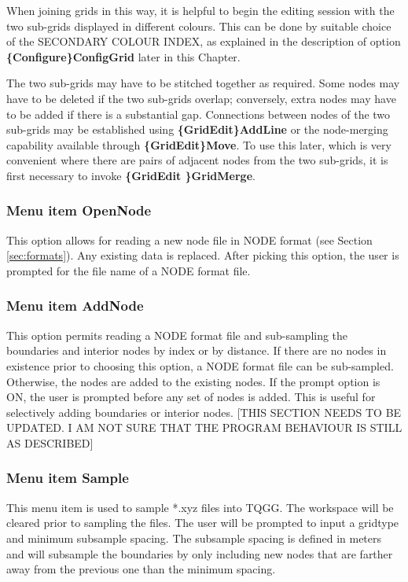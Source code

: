\documentclass{article}
\begin{document}
When joining grids in this way, it is helpful to begin the editing session with the two sub-grids displayed in different colours. This can be done by suitable choice of the SECONDARY COLOUR INDEX, as explained in the description of option \textbf{\{Configure\}ConfigGrid} later in this Chapter.

The two sub-grids may have to be stitched together as required. Some nodes may have to be deleted if the two sub-grids overlap; conversely, extra nodes may have to be added if there is a substantial gap. Connections between nodes of the two sub-grids may be established using \textbf{\{GridEdit\}AddLine} or the node-merging capability available through \textbf{\{GridEdit\}Move}. To use this later, which is very convenient where there are pairs of adjacent nodes from the two sub-grids, it is first necessary to invoke \textbf{\{GridEdit \}GridMerge}.

\subsubsection[Menu item OpenNode]{Menu item OpenNode}
This option allows for reading a new node file in NODE format (see Section \ref{sec:formats}). Any existing data is replaced. After picking this option, the user is prompted for the file name of a NODE format file.

\subsubsection[Menu item AddNode]{Menu item AddNode}
This option permits reading a NODE format file and sub-sampling the boundaries and interior nodes by index or by distance. If there are no nodes in existence prior to choosing this option, a NODE format file can be sub-sampled. Otherwise, the nodes are added to the existing nodes. If the prompt option is ON, the user is prompted before any set of nodes is added. This is useful for selectively adding boundaries or interior nodes. [THIS SECTION NEEDS TO BE UPDATED.  I AM NOT SURE THAT THE PROGRAM BEHAVIOUR IS STILL AS DESCRIBED]

\subsubsection[Menu item Sample]{Menu item Sample}
This menu item is used to sample *.xyz files into TQGG. The workspace will be cleared prior to sampling the files.
The user will be prompted to input a gridtype and minimum subsample spacing. The subsample spacing is defined in meters and will subsample the boundaries by only including new nodes that are farther away from the previous one than the minimum spacing.
\end{document}
